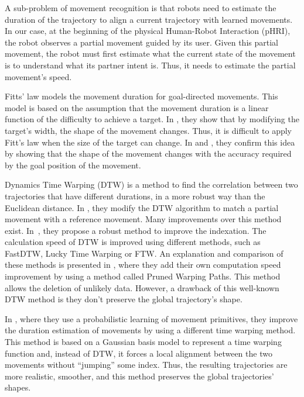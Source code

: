 \documentclass[utf8]{frontiersSCNS} %
\begin{document}
A sub-problem of movement recognition is that robots need to estimate the duration of the trajectory to align a current trajectory with learned movements. In our case, at the beginning of the physical Human-Robot Interaction (pHRI), the robot observes a partial movement guided by its user. Given this partial movement, the robot must first estimate what the current state of the movement is to understand what its partner intent is. Thus, it needs to estimate the partial movement's speed.

Fitts' law models the movement duration for goal-directed movements. This model is based on the assumption that the movement duration is a linear function of the difficulty to achieve a target\cite{fitts1992information}. In \cite{langolf1976investigation}, they show that by modifying the target's width, the shape of the movement changes. Thus, it is difficult to apply Fitt's law when the size of the target can change. In \cite{langolf1976investigation} and \cite{soechting1984effect}, they confirm this idea by showing that the shape of the movement changes with the accuracy required by the goal position of the movement. 

 Dynamics Time Warping (DTW) is a method to find the correlation between two trajectories that have different durations, in a more robust way than the Euclidean distance. In \cite{amor2014interaction}, they modify the DTW algorithm to match a partial movement with a reference movement.
Many improvements over this method exist. In~\cite{keogh2002exact}, they propose a robust method to improve the indexation. The calculation speed of DTW is improved using different methods, such as FastDTW, Lucky Time Warping or FTW. An explanation and comparison of these methods is presented in \cite{silva2016speeding}, where they add their own computation speed improvement by using a method called Pruned Warping Paths. This method allows the deletion of unlikely data. However, a drawback of this well-known DTW method is they don't preserve the global trajectory's shape. 

In \cite{maeda2014learning}, where they use a probabilistic learning of movement primitives, they improve the duration estimation of movements by using a different time warping method. This method is based on a Gaussian basis model to represent a time warping function and, instead of DTW, it forces a local alignment between the two movements without ``jumping'' some index. Thus, the resulting trajectories are more realistic, smoother, and this method preserves the global trajectories' shapes.
\end{document}
